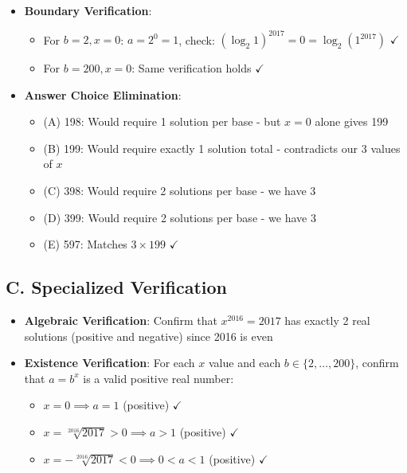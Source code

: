 \documentclass[]{article}
\begin{document}
\begin{verificationbox}
\begin{itemize}[leftmargin=*]
    \item \textbf{Boundary Verification}:
    \begin{itemize}
        \item For $b=2, x=0$: $a=2^0=1$, check: $(\log_2 1)^{2017} = 0 = \log_2(1^{2017})$ $\checkmark$
        \item For $b=200, x=0$: Same verification holds $\checkmark$
    \end{itemize}
    
    \item \textbf{Answer Choice Elimination}:
    \begin{itemize}
        \item (A) 198: Would require 1 solution per base - but $x=0$ alone gives 199
        \item (B) 199: Would require exactly 1 solution total - contradicts our 3 values of $x$
        \item (C) 398: Would require 2 solutions per base - we have 3
        \item (D) 399: Would require 2 solutions per base - we have 3
        \item (E) 597: Matches $3 \times 199$ $\checkmark$
    \end{itemize}
\end{itemize}

\subsection*{C. Specialized Verification}
\begin{itemize}[leftmargin=*]
    \item \textbf{Algebraic Verification}: Confirm that $x^{2016} = 2017$ has exactly 2 real solutions (positive and negative) since 2016 is even
    
    \item \textbf{Existence Verification}: For each $x$ value and each $b \in \{2,\ldots,200\}$, confirm that $a = b^x$ is a valid positive real number:
    \begin{itemize}
        \item $x=0 \implies a=1$ (positive) $\checkmark$
        \item $x=\sqrt[2016]{2017} > 0 \implies a > 1$ (positive) $\checkmark$
        \item $x=-\sqrt[2016]{2017} < 0 \implies 0 < a < 1$ (positive) $\checkmark$
    \end{itemize}
\end{itemize}


\end{verificationbox}
\end{document}
